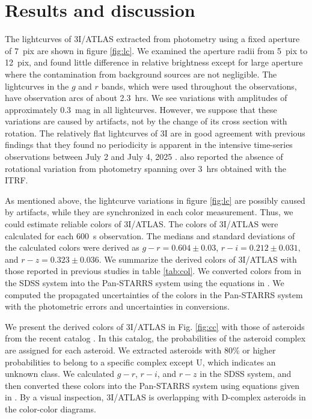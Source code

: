 \documentclass[]{pasj02}
\newcommand\I{3I/ATLAS\xspace}
\newcommand\gr{$g-r=0.604\pm0.03$\xspace}
\newcommand\ri{$r-i=0.212\pm0.031$\xspace}
\newcommand\rz{$r-z=0.323\pm0.036$\xspace}
\begin{document}
\section{Results and discussion}\label{sec:res}
The lightcurves of \I extracted from photometry using a fixed aperture of 7~pix are shown in figure \ref{fig:lc}.
We examined the aperture radii from 5~pix to 12~pix, and found little difference in relative brightness
except for large aperture where the contamination from background sources are not negligible.
The lightcurves in the $g$ and $r$ bands, which were used throughout the observations, have observation arcs of about 2.3~hrs.
We see variations with amplitudes of approximately 0.3~mag in all lightcurves.
However, we suppose that these variations are caused by artifacts, not by the change of its cross section with rotation.
The relatively flat lightcurves of 3I are in good agreement with previous findings that they found no periodicity is apparent in the intensive time-series observations between July 2 and July 4, 2025 \citep{Seligman2025_3I}. \citep{Kareta2025_3I} also reported the absence of rotational variation from photometry spanning over 3~hrs obtained with the ITRF.

As mentioned above, the lightcurve variations in figure \ref{fig:lc} are
possibly caused by artifacts, while they are synchronized in each color measurement.
Thus, we could estimate reliable colors of \I.
The colors of \I were calculated for each 600~s observation.
The medians and standard deviations of the calculated colors 
were derived as \gr, \ri, and \rz. 
We summarize the derived colors of \I 
with those reported in previous studies in table \ref{tab:col}.
We converted colors from \cite{Bolin2025_3I} in the SDSS system 
into the Pan-STARRS system using the equations in \cite{Tonry2012}.
We computed the propagated uncertainties of the colors in the Pan-STARRS system
with the photometric errors and uncertainties in conversions.

We present the derived colors of \I in Fig. \ref{fig:cc} 
with those of asteroids from the recent catalog \citep{Sergeyev2021}.
In this catalog, the probabilities of the asteroid complex are assigned for each asteroid. 
We extracted asteroids with 80\% or higher probabilities to belong to a specific complex except U, which indicates an unknown class.
We calculated $g-r$, $r-i$, and $r-z$ in the SDSS system, 
and then converted these colors into the Pan-STARRS system using equations given in \cite{Tonry2012}.
By a visual inspection, 
\I is overlapping with D-complex asteroids in the color-color diagrams.
\end{document}
